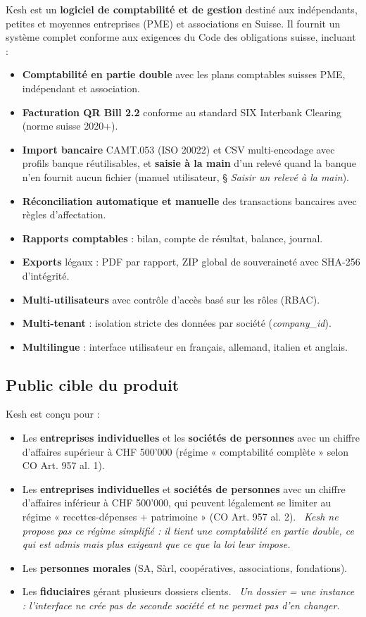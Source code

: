 \documentclass[a4paper,11pt,oneside]{article}
\begin{document}
Kesh est un \textbf{logiciel de comptabilité et de gestion} destiné aux indépendants, petites et moyennes entreprises (PME) et associations en Suisse. Il fournit un système complet conforme aux exigences du Code des obligations suisse, incluant :

\begin{itemize}
    \item \textbf{Comptabilité en partie double} avec les plans comptables suisses PME, indépendant et association.
    \item \textbf{Facturation QR Bill 2.2} conforme au standard SIX Interbank Clearing (norme suisse 2020+).
    \item \textbf{Import bancaire} CAMT.053 (ISO 20022) et CSV multi-encodage avec profils banque réutilisables, et \textbf{saisie à la main} d'un relevé quand la banque n'en fournit aucun fichier (manuel utilisateur, § \emph{Saisir un relevé à la main}).
    \item \textbf{Réconciliation automatique et manuelle} des transactions bancaires avec règles d'affectation.
    \item \textbf{Rapports comptables} : bilan, compte de résultat, balance, journal.
    \item \textbf{Exports} légaux : PDF par rapport, ZIP global de souveraineté avec SHA-256 d'intégrité.
    \item \textbf{Multi-utilisateurs} avec contrôle d'accès basé sur les rôles (RBAC).
    \item \textbf{Multi-tenant} : isolation stricte des données par société (\emph{company\_id}).
    \item \textbf{Multilingue} : interface utilisateur en français, allemand, italien et anglais.
\end{itemize}

\subsection{Public cible du produit}

Kesh est conçu pour :

\begin{itemize}
    \item Les \textbf{entreprises individuelles} et les \textbf{sociétés de personnes} avec un chiffre d'affaires supérieur à CHF 500'000 (régime « comptabilité complète » selon CO Art. 957 al. 1).
    \item Les \textbf{entreprises individuelles} et \textbf{sociétés de personnes} avec un chiffre d'affaires inférieur à CHF 500'000, qui peuvent légalement se limiter au régime « recettes-dépenses + patrimoine » (CO Art. 957 al. 2). \keshAttention\ \emph{Kesh ne propose pas ce régime simplifié : il tient une comptabilité en partie double, ce qui est admis mais plus exigeant que ce que la loi leur impose.}
    \item Les \textbf{personnes morales} (SA, Sàrl, coopératives, associations, fondations).
    \item Les \textbf{fiduciaires} gérant plusieurs dossiers clients. \keshAttention\ \emph{Un dossier = une instance : l'interface ne crée pas de seconde société et ne permet pas d'en changer.}
\end{itemize}
\end{document}
